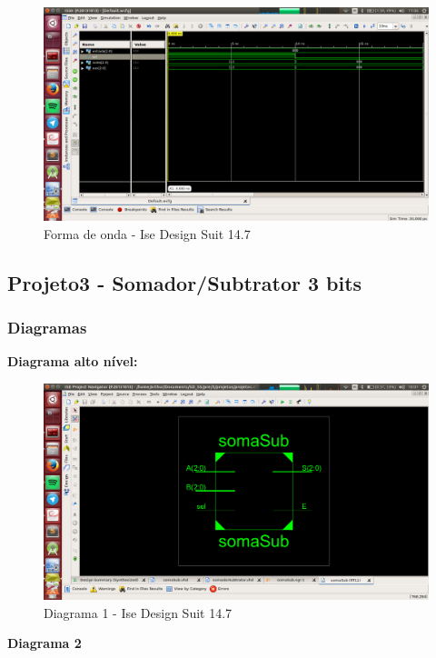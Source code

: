 \documentclass[12pts]{article}
\begin{document}
\begin{figure}[!htb]
  \centering
  \includegraphics[scale=0.3	]{imagens/complemento1}
  \caption{Forma de onda - Ise Design Suit 14.7}
  \label{figRotulo}
\end{figure}

\newpage
\subsection{Projeto3 - Somador/Subtrator 3 bits}
\subsubsection{Diagramas}

\textbf{Diagrama alto nível:}

\begin{figure}[!htb]
  \centering
  \includegraphics[scale=0.3	]{imagens/somaSub1}
  \caption{Diagrama 1 - Ise Design Suit 14.7}
  \label{figRotulo}
\end{figure}

\newpage
\textbf{Diagrama 2 }
\end{document}

